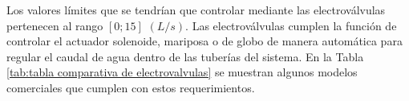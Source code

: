 Los valores límites que se tendrían que controlar mediante las electroválvulas pertenecen al rango $[0;15]$ $(L/s)$. Las electroválvulas cumplen la función de controlar el actuador solenoide, mariposa o de globo de manera automática para regular el caudal de agua dentro de las tuberías del sistema. En la Tabla \ref{tab:tabla comparativa de electrovalvulas} se muestran algunos modelos comerciales que cumplen con estos requerimientos.

